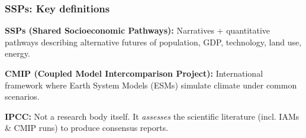 \documentclass[xcolor=x11names,compress,aspectratio=169]{beamer}%
\makeatletter
\renewenvironment{itemize}{\begin{compactitemize}[<+-| alert@+>]}{\end{compactitemize}}
\makeatother
\begin{document}
\begin{frame}%
%

\frametitle{SSPs: Key definitions}%


\begin{itemize}
\item \textbf{SSPs (Shared Socioeconomic Pathways):} Narratives + quantitative
pathways describing alternative futures of population, GDP, technology, land
use, energy.%
\vspace{2ex}%


\item \textbf{CMIP (Coupled Model Intercomparison Project):} International
framework where Earth System Models (ESMs) simulate climate under common
scenarios.%
\vspace{2ex}%


\item \textbf{IPCC:} Not a research body itself. It \emph{assesses} the
scientific literature (incl. IAMs \& CMIP runs) to produce consensus reports.
\end{itemize}

%

\transboxout
\end{frame}%
%
\end{document}
